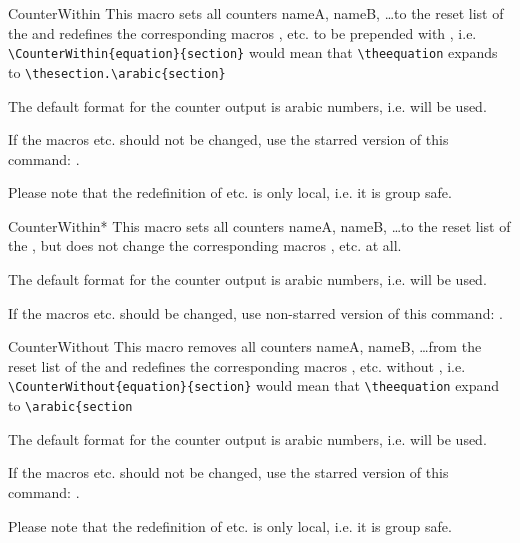 \documentclass[12pt,a4paper,oneside]{article}
\makeatletter
\newcommand{\chdocextractversion}[1]{%
  \@nameuse{#1}%
}
\newcommand{\CHDocNew}[1]{%
  \tcbdocmarginnote[doclang/new={N},
  colframe=blue,
  halign=left,
  colback={blue!20!white},
  fontupper={\tiny}
  ]{%
    \chdocextractversion{xassoccntversion#1}%
  }%
}
\makeatother
\begin{document}
\begin{docCommand}[before={\CHDocNew{1.4}}\par]{CounterWithin}{} 
  This macro sets all counters nameA, nameB, \dots to the reset list of the  and redefines the corresponding macros , etc. to be prepended with , i.e. \verb!\CounterWithin{equation}{section}! would mean that  \verb!\theequation! expands to \verb!\thesection.\arabic{section}!

  The default format for the counter output is arabic numbers, i.e.  will be used. 

If the macros  etc. should not be changed, use the starred version of this command: . 

    \begin{marker}
      Please note that the redefinition of  etc. is only local, i.e. it is group safe. 
    \end{marker}
\end{docCommand}

\begin{docCommand}[before={\CHDocNew{1.4}}\par]{CounterWithin*}{} 
  This macro sets all counters nameA, nameB, \dots to the reset list of the , but does not change the corresponding macros , etc. at all. 

  The default format for the counter output is arabic numbers, i.e.  will be used. 

  If the macros  etc. should be changed, use non-starred version of this command: . 

\end{docCommand}


\begin{docCommand}[before={\CHDocNew{1.4}}\par]{CounterWithout}{} 
  This macro removes all counters nameA, nameB, \dots from the reset list of the  and redefines the corresponding macros , etc. without , i.e. \verb!\CounterWithout{equation}{section}! would mean that \verb!\theequation! expand to \verb!\arabic{section!

    The default format for the counter output is arabic numbers, i.e.  will be used. 

    If the macros  etc. should not be changed, use the starred version of this command: . 

    \begin{marker}
      Please note that the redefinition of  etc. is only local, i.e. it is group safe. 
      \end{marker}

\end{docCommand}
\end{document}
